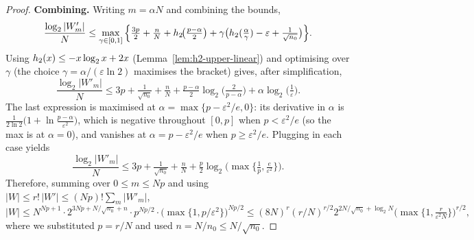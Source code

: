 \begin{proof}
  \textbf{Combining.} Writing $m = \alpha N$ and combining the bounds,
  \[
    \frac{\log_2|W'_m|}{N} \leq \max_{\gamma\in[0,1]}
      \Big\{\tfrac{3p}{2} + \tfrac{n}{N} + h_2\!\big(\tfrac{p-\alpha}{2}\big)
      + \gamma\big(h_2(\tfrac{\alpha}{\gamma}) - \varepsilon +
      \tfrac{1}{\sqrt{n_0}}\big)\Big\}.
  \]
  Using $h_2(x) \leq -x\log_2 x + 2x$ (Lemma~\ref{lem:h2-upper-linear}) and
  optimising over $\gamma$ (the choice $\gamma = \alpha/(\varepsilon\ln 2)$
  maximises the bracket) gives, after simplification,
  \[
    \frac{\log_2|W'_m|}{N} \leq 3p + \tfrac{1}{\sqrt{n_0}} + \tfrac{n}{N}
      + \tfrac{p-\alpha}{2}\log_2\!\big(\tfrac{2}{p-\alpha}\big)
      + \alpha\log_2\!\big(\tfrac{1}{\varepsilon}\big).
  \]
  The last expression is maximised at $\alpha = \max\{p - \varepsilon^2/e, 0\}$:
  its derivative in $\alpha$ is $\frac{1}{2\ln 2}\big(1 + \ln\frac{p-\alpha}{
  \varepsilon^2}\big)$, which is negative throughout $[0,p]$ when
  $p < \varepsilon^2/e$ (so the max is at $\alpha = 0$), and vanishes at
  $\alpha = p - \varepsilon^2/e$ when $p \geq \varepsilon^2/e$. Plugging in each
  case yields
  \[
    \frac{\log_2|W'_m|}{N} \leq 3p + \tfrac{1}{\sqrt{n_0}} + \tfrac{n}{N}
      + \tfrac{p}{2}\log_2\!\Big(\max\big\{\tfrac{1}{p}, \tfrac{e}{\varepsilon^2}\big\}\Big).
  \]
  Therefore, summing over $0 \leq m \leq Np$ and using $|W| \leq r!\,|W'| \leq
  (Np)!\sum_{m}|W'_m|$,
  \[
    |W| \leq N^{Np+1}\cdot 2^{3Np + N/\sqrt{n_0} + n}\cdot p^{Np/2}\cdot
      \big(\max\{1, p/\varepsilon^2\}\big)^{Np/2}
      \leq (8N)^r (r/N)^{r/2} 2^{2N/\sqrt{n_0}+\log_2 N}
      \big(\max\{1, \tfrac{r}{\varepsilon^2 N}\}\big)^{r/2},
  \]
  where we substituted $p = r/N$ and used $n = N/n_0 \leq N/\sqrt{n_0}$.
\end{proof}

